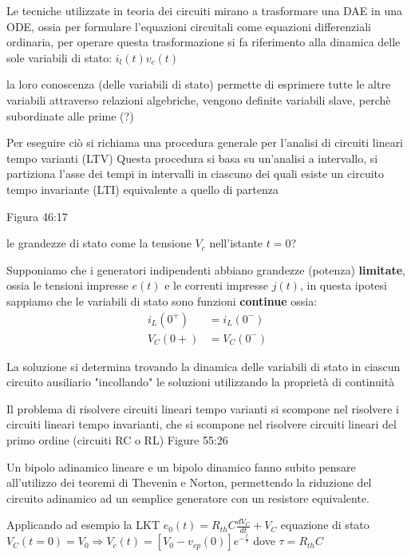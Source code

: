 Le tecniche utilizzate in teoria dei circuiti mirano a trasformare una DAE in una ODE, ossia 
per formulare l'equazioni circuitali come equazioni differenziali ordinaria, per operare questa trasformazione si fa riferimento
alla dinamica delle sole {variabili di stato}: $i_l(t) v_c(t)$

la loro conoscenza (delle variabili di stato) permette di esprimere tutte le altre variabili attraverso relazioni algebriche, vengono definite
variabili slave, perchè subordinate alle prime (?) %


Per eseguire ciò si richiama una procedura generale per l'analisi di circuiti lineari tempo varianti (LTV)
Questa procedura si basa su un'analisi a intervallo, si partiziona l'asse dei tempi in intervalli in ciascuno dei quali esiste un circuito 
tempo invariante (LTI) equivalente a quello di partenza

Figura 46:17

le grandezze di stato come la tensione $V_c$ nell'istante $t=0$?

Supponiamo che i generatori indipendenti abbiano grandezze (potenza) \textbf{limitate}, ossia le tensioni impresse $e(t)$ e le correnti impresse $j(t)$,
in questa ipotesi sappiamo che le variabili di stato sono funzioni \textbf{continue} ossia:
\begin{equation*}
\begin{split}
i_L (0^+) & = i_L(0^-) \\ 
V_C (0+) & = V_C(0^-)
\end{split}
\end{equation*}

La soluzione si determina trovando la dinamica delle variabili di stato in ciascun circuito ausiliario "incollando" le soluzioni utilizzando la proprietà di continuità

Il problema di risolvere circuiti lineari tempo varianti si scompone nel risolvere i circuiti lineari tempo invarianti, che si scompone nel risolvere
circuiti lineari del primo ordine (circuiti RC o RL)
Figure 55:26

Un bipolo adinamico lineare e un bipolo dinamico fanno subito pensare all'utilizzo dei teoremi di Thevenin e Norton, permettendo la riduzione del circuito 
adinamico ad un semplice generatore con un resistore equivalente.

Applicando ad esempio la LKT $e_0(t) = R_{th} C \frac{dV_C}{dt} + V_C$ equazione di stato
$V_C(t=0) = V_0   \Rightarrow V_c(t) = [V_0-v_{cp}(0)] e ^{-\frac{t}{\tau}}$ dove $\tau = R_{th}C$
 
